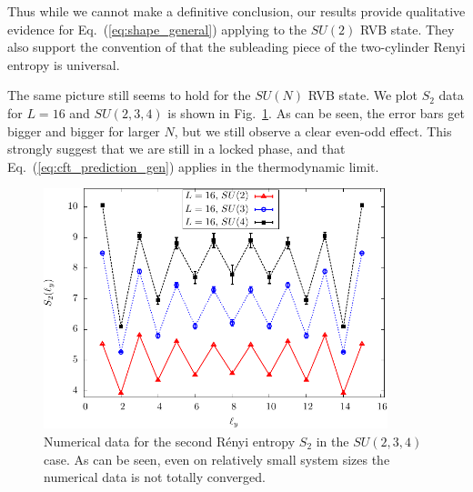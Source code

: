 \documentclass[11pt]{iopart}
\begin{document}
Thus while we cannot make a definitive conclusion, our results provide qualitative evidence for Eq.~(\ref{eq:shape_general}) applying to the $SU(2)$ RVB state. They also support the convention of \cite{Ju2012} that the subleading piece of the two-cylinder Renyi entropy is universal.




The same picture still seems to hold for the $SU(N)$ RVB state. We plot $S_2$ data for $L=16$ and $SU(2,3,4)$ is shown in Fig.~\ref{fig:SUN_shape}. As can be seen, the error bars get bigger and bigger for larger $N$, but we still observe a clear even-odd effect. This strongly suggest that we are still in a locked phase, and that Eq.~(\ref{eq:cft_prediction_gen}) applies in the thermodynamic limit. 
\begin{figure}[ht]
 \begin{center}
  \includegraphics[width=10cm]{./figures/SUN_shape.pdf}
 \end{center}
\caption{Numerical data for the second R\'enyi entropy $S_2$ in the $SU(2,3,4)$ case. As can be seen, even on relatively small system sizes the numerical data is not totally converged. }
\label{fig:SUN_shape}
\end{figure}
\end{document}
